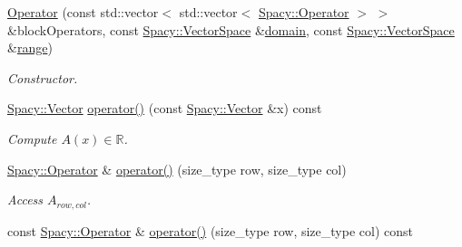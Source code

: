 \begin{DoxyCompactItemize}
\item 
\hyperlink{classSpacy_1_1ProductSpace_1_1Operator_a31794ff8ff1e9349c82dc67db3725f09}{Operator} (const std\-::vector$<$ std\-::vector$<$ \hyperlink{classSpacy_1_1Operator}{Spacy\-::\-Operator} $>$ $>$ \&block\-Operators, const \hyperlink{classSpacy_1_1VectorSpace}{Spacy\-::\-Vector\-Space} \&\hyperlink{classSpacy_1_1OperatorBase_a2588f9b3e0188820c4c494e63293dc6f}{domain}, const \hyperlink{classSpacy_1_1VectorSpace}{Spacy\-::\-Vector\-Space} \&\hyperlink{classSpacy_1_1OperatorBase_ab19d3b7a6f290b1079248f1e567e53d6}{range})
\begin{DoxyCompactList}\small\item\em Constructor. \end{DoxyCompactList}\item 
\hypertarget{classSpacy_1_1ProductSpace_1_1Operator_a73e91a3e8d2623e1e59a7d6ca99ca6c0}{\hyperlink{classSpacy_1_1Vector}{Spacy\-::\-Vector} \hyperlink{classSpacy_1_1ProductSpace_1_1Operator_a73e91a3e8d2623e1e59a7d6ca99ca6c0}{operator()} (const \hyperlink{classSpacy_1_1Vector}{Spacy\-::\-Vector} \&x) const }\label{classSpacy_1_1ProductSpace_1_1Operator_a73e91a3e8d2623e1e59a7d6ca99ca6c0}

\begin{DoxyCompactList}\small\item\em Compute $A(x)\in\mathbb{R}$. \end{DoxyCompactList}\item 
\hypertarget{classSpacy_1_1ProductSpace_1_1Operator_a98e9c1a74ca866f09dc8af1d78b60d10}{\hyperlink{classSpacy_1_1Operator}{Spacy\-::\-Operator} \& \hyperlink{classSpacy_1_1ProductSpace_1_1Operator_a98e9c1a74ca866f09dc8af1d78b60d10}{operator()} (size\-\_\-type row, size\-\_\-type col)}\label{classSpacy_1_1ProductSpace_1_1Operator_a98e9c1a74ca866f09dc8af1d78b60d10}

\begin{DoxyCompactList}\small\item\em Access $A_{row,col}$. \end{DoxyCompactList}\item 
\hypertarget{classSpacy_1_1ProductSpace_1_1Operator_a4e5a24cc27ee39f0252204bb29eef12f}{const \hyperlink{classSpacy_1_1Operator}{Spacy\-::\-Operator} \& \hyperlink{classSpacy_1_1ProductSpace_1_1Operator_a4e5a24cc27ee39f0252204bb29eef12f}{operator()} (size\-\_\-type row, size\-\_\-type col) const }\label{classSpacy_1_1ProductSpace_1_1Operator_a4e5a24cc27ee39f0252204bb29eef12f}


\end{DoxyCompactItemize}
